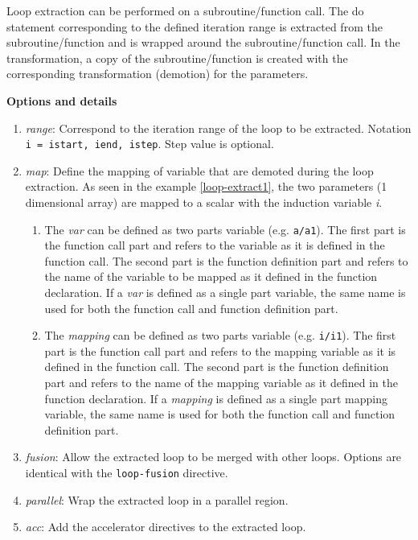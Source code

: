 Loop extraction can be performed on a subroutine/function call. The do statement corresponding
to the defined iteration range is extracted from the subroutine/function and is wrapped
around the subroutine/function call. In the transformation, a copy of the subroutine/function
is created with the corresponding transformation (demotion) for the parameters.


\textbf{Options and details}
\begin{enumerate}
\item \textit{range}: Correspond to the iteration range of the loop to be extracted.
  Notation \lstinline!i = istart, iend, istep!. Step value is optional. 
\item \textit{map}: Define the mapping of variable that are demoted during the loop
  extraction. As seen in the example \ref{loop-extract1}, the two parameters (1 dimensional array)
  are mapped to a scalar with the induction variable \textit{i}.
  \begin{enumerate}
    \item The \textit{var} can be defined as two parts variable (e.g. \lstinline!a/a1!). The
    first part is the function call part and refers to the variable as it is
    defined in the function call. The second part is the function definition
    part and refers to the name of the variable to be mapped as it defined in
    the function declaration. If a \textit{var} is defined as a single part variable,
    the same name is used for both the function call and function definition
    part.
    \item The \textit{mapping} can be defined as two parts variable (e.g. \lstinline!i/i1!). The
    first part is the function call part and refers to the mapping variable as
    it is defined in the function call. The second part is the function
    definition part and refers to the name of the mapping variable as it defined
    in the function declaration. If a \textit{mapping} is defined as a single part
    mapping variable, the same name is used for both the function call and
    function definition part.
    \end{enumerate}
\item \textit{fusion}: Allow the extracted loop to be merged with other loops.
Options are identical with the \lstinline!loop-fusion! directive.
\item \textit{parallel}: Wrap the extracted loop in a parallel region.
\item \textit{acc}: Add the accelerator directives to the extracted loop.
\end{enumerate}

